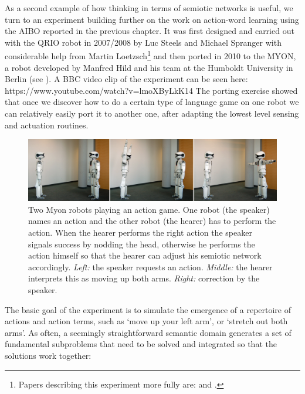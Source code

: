 As a second example of how thinking in terms of semiotic networks is useful,
we turn to an experiment building further on the work on action-word learning 
using the AIBO reported in the previous chapter.
It was first designed and carried out with the QRIO robot in 2007/2008 by Luc Steels and
Michael Spranger with considerable help from Martin Loetzsch\footnote{Papers describing this experiment more fully are: 
\cite{Steels:2008spatial} and \cite{Steels:2008b}.} and 
then ported in 2010 to the MYON, a robot developed by Manfred Hild and his team at the Humboldt 
University in Berlin (see ).\cite{Steels:2012b}
A BBC video clip of the experiment can be seen here: https://www.youtube.com/watch?v=lmoXByLkK14
The porting exercise showed that once we discover how to do a certain type of language game on one robot 
we can relatively easily port it to another one, after adapting the lowest level sensing and actuation routines. 

\begin{figure}[htbp]
  \centerline{\includegraphics[width=1.0\textwidth]{chap11/figs/myon-action-game}}
\caption{
Two Myon robots playing an action game. One robot (the speaker) names an action and the other robot (the hearer) 
has to perform the action. When the hearer performs the right action the speaker signals success by nodding the head, 
otherwise he performs the action himself so that the hearer can adjust his semiotic network accordingly. {\itshape Left:} the speaker
requests an action. {\itshape Middle:} the hearer interprets this as moving up both arms. {\itshape Right:} correction by the speaker. 
}\label{fig:myon-action} 
\end{figure}

The basic goal of the experiment is to simulate the emergence of a repertoire of actions and action terms, such as 
`move up your left arm', or `stretch out both arms'. As often, a seemingly straightforward semantic domain generates 
a set of fundamental subproblems that need to be solved and integrated so that the solutions work together: 

